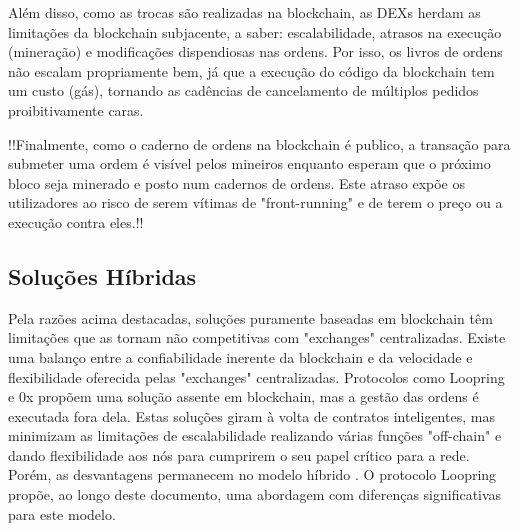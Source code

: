 \documentclass[UTF8,nofonts]{article}
\begin{document}
\begin{multicols}{2}
Além disso, como as trocas são realizadas na blockchain, as DEXs herdam as limitações da blockchain subjacente, a saber: escalabilidade, atrasos na execução (mineração) e modificações dispendiosas nas ordens. Por isso, os livros de ordens não escalam propriamente bem, já que a execução do código da blockchain tem um custo (gás), tornando as cadências de cancelamento de múltiplos pedidos proibitivamente caras.

!!Finalmente, como o caderno de ordens na blockchain é publico, a transação para submeter uma ordem é visível pelos mineiros enquanto esperam que o próximo bloco seja minerado e posto num cadernos de ordens. Este atraso expõe os utilizadores ao risco de serem vítimas de "front-running" e de terem o preço ou a execução contra eles.!!

\subsection{Soluções Híbridas}
Pela razões acima destacadas, soluções puramente baseadas em blockchain têm limitações que as tornam não competitivas com "exchanges" centralizadas. Existe uma balanço entre a confiabilidade inerente da blockchain e da velocidade e flexibilidade oferecida pelas "exchanges" centralizadas. Protocolos como Loopring e 0x \cite{warren20170x} propõem uma solução assente em blockchain, mas a gestão das ordens é executada fora dela. Estas soluções giram à volta de contratos inteligentes, mas minimizam as limitações de escalabilidade realizando várias funções "off-chain" e dando flexibilidade aos nós para cumprirem o seu papel crítico para a rede. Porém, as desvantagens permanecem no modelo híbrido \cite{costofdecent}. O protocolo Loopring propõe, ao longo deste documento, uma abordagem com diferenças significativas para este modelo.



\end{multicols}
\end{document}
